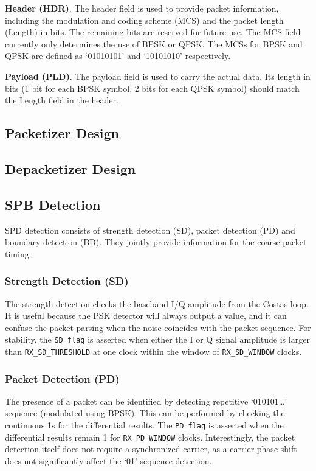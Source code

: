 \documentclass[journal,twoside]{IEEEtran}
\begin{document}
    \textbf{Header (HDR)}.
    The header field is used to provide packet information,
    including the modulation and coding scheme (MCS) and the packet length (Length) in bits.
    The remaining bits are reserved for future use.
    The MCS field currently only determines the use of BPSK or QPSK.
    The MCSs for BPSK and QPSK are defined as `01010101' and `10101010' respectively.

    \textbf{Payload (PLD)}.
    The payload field is used to carry the actual data.
    Its length in bits (1 bit for each BPSK symbol, 2 bits for each QPSK symbol) should match the Length field in the header.

    \subsection{Packetizer Design}

    \subsection{Depacketizer Design}

    \subsection{SPB Detection}

      SPD detection consists of strength detection (SD),
      packet detection (PD) and boundary detection (BD).
      They jointly provide information for the coarse packet timing.

      \subsubsection{Strength Detection (SD)}
      The strength detection checks the baseband I/Q amplitude from the Costas loop.
      It is useful because the PSK detector will always output a value,
      and it can confuse the packet parsing when the noise coincides with the packet sequence.
      For stability, the \texttt{SD\_flag} is asserted when
      either the I or Q signal amplitude is larger than \texttt{RX\_SD\_THRESHOLD}
      at one clock within the window of \texttt{RX\_SD\_WINDOW} clocks.

      \subsubsection{Packet Detection (PD)}
      The presence of a packet can be identified by detecting repetitive `010101\dots' sequence (modulated using BPSK).
      This can be performed by checking the continuous 1s for the differential results.
      The \texttt{PD\_flag} is asserted when the differential results remain 1 for \texttt{RX\_PD\_WINDOW} clocks.
      Interestingly, the packet detection itself does not require a synchronized carrier,
      as a carrier phase shift does not significantly affect the `01' sequence detection.
\end{document}
